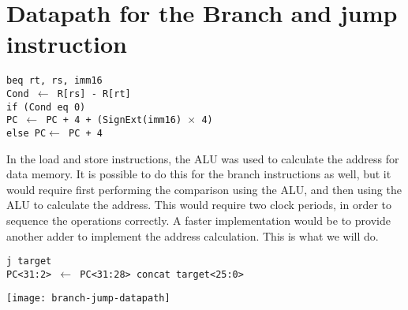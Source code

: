 \documentclass[12pt]{report}
\begin{document}
\section{Datapath for the Branch and jump instruction}
\begin{center}
  \texttt{beq rt, rs, imm16\\
 Cond $\longleftarrow$ R[rs] - R[rt] \\
      if (Cond eq 0)\\
PC $\longleftarrow$ PC + 4 +
(SignExt(imm16) $\times$ 4)\\
 else PC$\longleftarrow$ PC + 4}
\end{center}
In the load and store instructions, the ALU was used to calculate
the address for data memory.
It is possible to do this for the branch instructions as well, but it
would require first performing the comparison using the ALU, and
then using the ALU to calculate the address.
This would require two clock periods, in order to sequence the operations
correctly.
A faster implementation would be to provide another adder to implement
the address calculation. This is what we will do.
\begin{center}
\texttt{j target\\
PC<31:2> $\longleftarrow$ PC<31:28>
concat target<25:0>}
\end{center}
\begin{adjustwidth}{-400pt}{-400pt}
\begin{center}
		\texttt{[image: branch-jump-datapath]}%
\end{center}
\end{adjustwidth}
					\label{fig:branch-jump-datapath}%
\newpage
\end{document}
